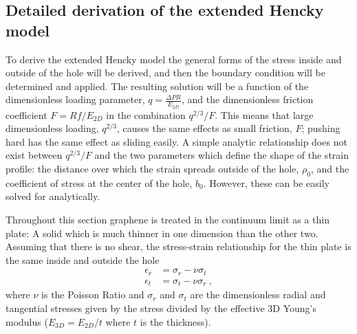 \subsection{Detailed derivation of the extended Hencky model}
To derive the extended Hencky model the general forms of the stress inside and outside of the hole will be derived, and then the boundary condition will be determined and applied.
The resulting solution will be a function of the dimensionless loading parameter, $q=\frac{\Delta PR}{E_{2D}}$, and the dimensionless friction coefficient $F=Rf/E_{2D}$ in the combination $q^{2/3}/F$.
This means that large dimensionless loading, $q^{2/3}$, causes the same effects as  small friction, $F$;  pushing hard has the same effect as sliding easily.
A simple analytic relationship does not exist between  $q^{2/3}/F$ and the two parameters which define the shape of the strain profile: the distance over which the strain spreads outside of the hole, $\rho_0$, and the coefficient of stress at the center of the hole, $b_0$.
However, these can be easily solved for analytically.

Throughout this section graphene is treated in the continuum limit as a thin plate: A solid which is much thinner in one dimension than the other two.
Assuming that there is no shear, the stress-strain relationship for the thin plate is the same inside and outside the hole \cite{Landau1986} 
\begin{align}
	\epsilon_r&=\sigma_r-\nu \sigma_t \label{eq:fri:esr}\\
	\epsilon_t&=\sigma_t-\nu \sigma_r \label{eq:fri:est} \ ,
\end{align}
where $\nu$ is the Poisson Ratio and $\sigma_r$ and $\sigma_t$ are the dimensionless radial and tangential stresses given by the stress divided by the effective 3D Young's modulus ($E_{3D}=E_{2D}/t$ where $t$ is the thickness).

